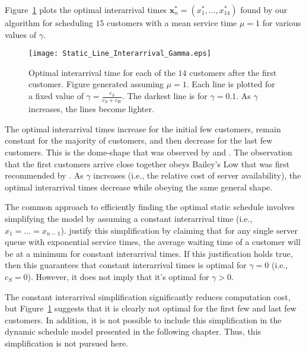 Figure~\ref{fig:Static_Time_Gamma} plots the optimal interarrival times $\mathbf{x}_{n}^{*} = (x_{1}^{*}, \ldots, x_{14}^{*})$ found by our algorithm for scheduling $15$ customers with a mean service time $\mu = 1$ for various values of $\gamma$.
\begin{figure}[htb]
	\centering
	\texttt{[image: Static\_Line\_Interarrival\_Gamma.eps]}
	\caption{Optimal interarrival time for each of the $14$ customers after the first customer. Figure generated assuming $\mu = 1$. Each line is plotted for a fixed value of $\gamma = \frac{c_{S}}{c_{S} + c_{W}}$. The darkest line is for $\gamma = 0.1$. As $\gamma$ increases, the lines become lighter.}
	\label{fig:Static_Time_Gamma}
\end{figure}

The optimal interarrival times increase for the initial few customers, remain constant for the majority of customers, and then decrease for the last few customers. This is the dome-shape that was observed by \citet{Stein} and \citet{Mendel}. The observation that the first customers arrive close together obeys Bailey's Low that was first recommended by \citet{Bailey}. As $\gamma$ increases (i.e., the relative cost of server availability), the optimal interarrival times decrease while obeying the same general shape.

The common approach to efficiently finding the optimal static schedule involves simplifying the model by assuming a constant interarrival time (i.e., $x_{1} = \ldots = x_{n - 1}$). \citet{Stein} justify this simplification by claiming that for any single server queue with exponential service times, the average waiting time of a customer will be at a minimum for constant interarrival times. If this justification holds true, then this guarantees that constant interarrival times is optimal for $\gamma = 0$ (i.e., $c_{S} = 0$). However, it does not imply that it's optimal for $\gamma > 0$.

The constant interarrival simplification significantly reduces computation cost, but Figure~\ref{fig:Static_Time_Gamma} suggests that it is clearly not optimal for the first few and last few customers. In addition, it is not possible to include this simplification in the dynamic schedule model presented in the following chapter. Thus, this simplification is not pursued here.










































